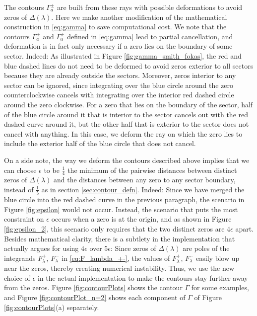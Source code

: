 \documentclass[12pt, oneside, a4paper]{article}
\begin{document}
The contours $\Gamma_a^\pm$ are built from these rays with possible deformations to avoid zeros of $\Delta(\lambda)$. Here we make another modification of the mathematical construction in \eqref{eq:gamma} to save computational cost. We note that the contours $\Gamma_a^\pm$ and $\Gamma_0^\pm$ defined in \eqref{eq:gamma} lead to partial cancellation, and deformation is in fact only necessary if a zero lies on the boundary of some sector. Indeed: As illustrated in Figure \ref{fig:gamma_smith_fokas}, the red and blue dashed lines do not need to be deformed to avoid zeros exterior to all sectors because they are already outside the sectors. Moreover, zeros interior to any sector can be ignored, since integrating over the blue circle around the zero counterclockwise cancels with integrating over the interior red dashed circle around the zero clockwise. For a zero that lies on the boundary of the sector, half of the blue circle around it that is interior to the sector cancels out with the red dashed curve around it, but the other half that is exterior to the sector does not cancel with anything. In this case, we deform the ray on which the zero lies to include the exterior half of the blue circle that does not cancel. 

On a side note, the way we deform the contours described above implies that we can choose $\epsilon$ to be $\frac{1}{4}$ the minimum of the pairwise distances between distinct zeros of $\Delta(\lambda)$ and the distances between any zero to any sector boundary, instead of $\frac{1}{5}$ as in section \ref{sec:contour_defn}. Indeed: Since we have merged the blue circle into the red dashed curve in the previous paragraph, the scenario in Figure \ref{fig:epsilon} would not occur. Instead, the scenario that puts the most constraint on $\epsilon$ occurs when a zero is at the origin, and as shown in Figure \ref{fig:epsilon_2}, this scenario only requires that the two distinct zeros are $4\epsilon$ apart. Besides mathematical clarity, there is a subtlety in the implementation that actually argues for using $4\epsilon$ over $5\epsilon$: Since zeros of $\Delta(\lambda)$ are poles of the integrands $F_\lambda^+$, $F_\lambda^-$ in \eqref{eq:F_lambda_+-}, the values of $F_\lambda^+$, $F_\lambda^-$ easily blow up near the zeros, thereby creating numerical instability. Thus, we use the new choice of $\epsilon$ in the actual implementation to make the contours stay further away from the zeros. Figure \ref{fig:contourPlots} shows the contour $\Gamma$ for some examples, and Figure \ref{fig:contourPlot_n=2} shows each component of $\Gamma$ of Figure \ref{fig:contourPlots}(a) separately.
\end{document}
